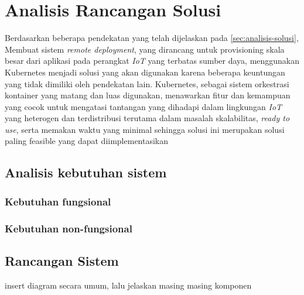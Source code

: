 \section{Analisis Rancangan Solusi}
\label{sec:analisis-rancangan-solusi}

Berdasarkan beberapa pendekatan yang telah dijelaskan pada \ref{sec:analisis-solusi}, Membuat sistem \textit{remote deployment}, yang dirancang untuk provisioning skala besar dari aplikasi pada perangkat \textit{IoT} yang terbatas sumber daya, menggunakan Kubernetes menjadi solusi yang akan digunakan karena beberapa keuntungan yang tidak dimiliki oleh pendekatan lain. Kubernetes, sebagai sistem orkestrasi kontainer yang matang dan luas digunakan, menawarkan fitur dan kemampuan yang cocok untuk mengatasi tantangan yang dihadapi dalam lingkungan \textit{IoT} yang heterogen dan terdistribusi terutama dalam masalah skalabilitas, \textit{ready to use}, serta memakan waktu yang minimal sehingga solusi ini merupakan solusi paling feasible yang dapat diimplementasikan


\subsection{Analisis kebutuhan sistem}
\subsubsection{Kebutuhan fungsional}
\subsubsection{Kebutuhan non-fungsional}

\subsection{Rancangan Sistem}
insert diagram secara umum, lalu jelaskan masing masing komponen
